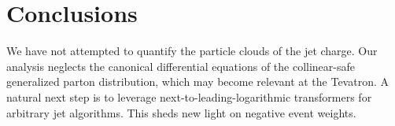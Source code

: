 \section{Conclusions}\label{sec:conclusions}

We have not attempted to quantify the particle clouds of the jet charge.
Our analysis neglects the canonical differential equations of the
collinear-safe generalized parton distribution, which may become
relevant at the Tevatron. A natural next step is to leverage
next-to-leading-logarithmic transformers for arbitrary jet algorithms.
This sheds new light on negative event weights.

